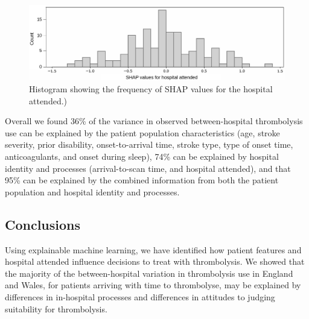\begin{figure}
    \centering
    \includegraphics[width=1\linewidth]{images/p2_hosp_shap.jpg}
    \caption{Histogram showing the frequency of SHAP values for the hospital attended.)}
    \label{fig:hospital_shap}
\end{figure}

Overall we found 36\% of the variance in observed between-hospital thrombolysis use can be explained by the patient population characteristics (age, stroke severity, prior disability, onset-to-arrival time, stroke type, type of onset time, anticoagulants, and onset during sleep), 74\% can be explained by hospital identity and processes (arrival-to-scan time, and hospital attended), and that 95\% can be explained by the combined information from both the patient population and hospital identity and processes.

\subsection{Conclusions}

Using explainable machine learning, we have identified how patient features and hospital attended influence decisions to treat with thrombolysis. We showed that the majority of the between-hospital variation in thrombolysis use in England and Wales, for patients arriving with time to thrombolyse, may be explained by differences in in-hospital processes and differences in attitudes to judging suitability for thrombolysis.